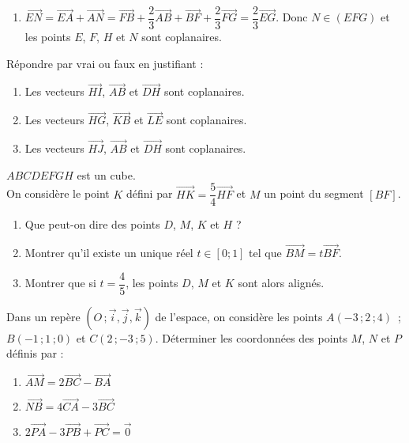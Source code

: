 \documentclass{cornouaille}
\begin{document}
\begin{solution}
\begin{enumerate}
\item $\overrightarrow{EN}=\overrightarrow{EA}+\overrightarrow{AN}=\overrightarrow{FB}+\dfrac{2}{3}\overrightarrow{AB}+\overrightarrow{BF}+\dfrac{2}{3}\overrightarrow{FG}=\dfrac{2}{3}\overrightarrow{EG}$.
Donc $N\in(EFG)$ et les points $E$, $F$, $H$ et $N$ sont coplanaires.
\end{enumerate}
\end{solution}

\begin{exercice}
  Répondre par vrai ou faux en justifiant :
  \begin{enumerate}
  \item Les vecteurs $\overrightarrow{HI}$, $\overrightarrow{AB}$ et
    $\overrightarrow{DH}$ sont coplanaires.
  \item Les vecteurs $\overrightarrow{HG}$, $\overrightarrow{KB}$ et
    $\overrightarrow{LE}$ sont coplanaires.
  \item Les vecteurs $\overrightarrow{HJ}$, $\overrightarrow{AB}$ et
    $\overrightarrow{DH}$ sont coplanaires.
  \end{enumerate}
\end{exercice}

\begin{exercice}
  $ABCDEFGH$ est un cube.\\
  On considère le point $K$ défini par
  $\overrightarrow{HK}=\dfrac{5}{4}\overrightarrow{HF}$ et $M$ un
  point du segment $[BF]$.
  \begin{enumerate}
  \item Que peut-on dire des points $D$, $M$, $K$ et $H$ ?
  \item Montrer qu'il existe un unique réel $t\in\left[ 0;1\right] $
    tel que $\overrightarrow{BM}=t\overrightarrow{BF}$.
  \item Montrer que si $t=\dfrac{4}{5}$, les points $D$, $M$ et $K$
    sont alors alignés.
  \end{enumerate}
\end{exercice}

\begin{exercice}
  Dans un repère $(O\,;\vec{i},\vec{j},\vec{k})$ de l'espace, on
  considère les points $A(-3\,;2\,;4)$ \,; $B(-1\,;1\,;0)$ et
  $C(2\,;-3\,;5)$.  Déterminer les coordonnées des points $M$, $N$ et
  $P$ définis par :
  \begin{enumerate}
  \item $\overrightarrow{AM}=2\overrightarrow{BC}-\overrightarrow{BA}$
  \item
    $\overrightarrow{NB}=4\overrightarrow{CA}-3\overrightarrow{BC}$
  \item
    $2\overrightarrow{PA}-3\overrightarrow{PB}+\overrightarrow{PC}=\overrightarrow{0}$
  \end{enumerate}
\end{exercice}
\end{document}
